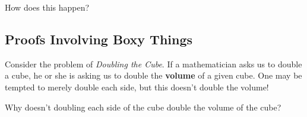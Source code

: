 \begin{question} 
How does this happen?   
\end{question}
\QM

\subsection{Proofs Involving Boxy Things}

Consider the problem of \textit{Doubling the Cube}. If a mathematician asks us to double a cube, he or she is asking us to double the \textbf{volume} of a given cube. One may be tempted to merely double each side, but this doesn't double the volume! 

\begin{question} Why doesn't doubling each side of the cube double the volume of the cube? 
\end{question}
\QM

